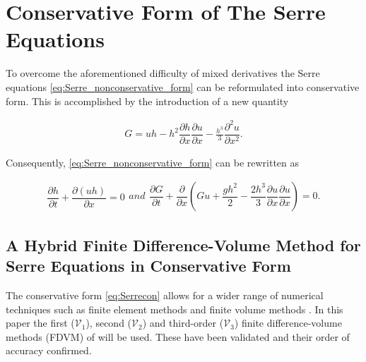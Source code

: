 \documentclass[SingleSpace,12pt,Proceedings]{Serre_ASCE}
\begin{document}
\section{Conservative Form of The Serre Equations}
To overcome the aforementioned difficulty of mixed derivatives the Serre equations \eqref{eq:Serre_nonconservative_form} can be reformulated into conservative form. This is accomplished by the introduction of a new quantity \cite{Hank-etal-2010-2034,Zoppou-2014}
\begin{linenomath*}
\begin{gather}
\label{eq:Gdefinition}
G = uh - h^2 \dfrac{\partial h}{\partial x} \dfrac{\partial u}{\partial x} - \frac{h^3}{3} \dfrac{\partial^2 u}{\partial x^2}.
\end{gather}
\end{linenomath*}
Consequently, \eqref{eq:Serre_nonconservative_form} can be rewritten as
\begin{linenomath*}
\begin{subequations}
\begin{gather}
\dfrac{\partial h}{\partial t} + \dfrac{\partial (uh)}{\partial x} = 0
\label{eq:Serrecon_continuity}
\end{gather}
and
\begin{gather}
\dfrac{\partial G}{\partial t} + \dfrac{\partial}{\partial x}\left(Gu + \dfrac{gh^2}{2} - \dfrac{2h^3}{3}\dfrac{\partial u}{\partial x}\dfrac{\partial u}{\partial x}\right) = 0.
\label{eq:Serrecon_momentum}
\end{gather}
\label{eq:Serrecon}
\end{subequations}
\end{linenomath*}

\subsection{A Hybrid Finite Difference-Volume Method for Serre Equations in Conservative Form}
\label{section:hybridmethod}
The conservative form \eqref{eq:Serrecon} allows for a wider range of numerical techniques such as finite element methods \cite{Guyenne-etal-2014-169} and finite volume methods \cite{Hank-etal-2010-2034,Zoppou-2014}. In this paper the first ($\mathcal{V}_1$), second ($\mathcal{V}_2$) and third-order ($\mathcal{V}_3$) finite difference-volume methods (FDVM) of  will be used. These have been validated and their order of accuracy confirmed.
\end{document}
